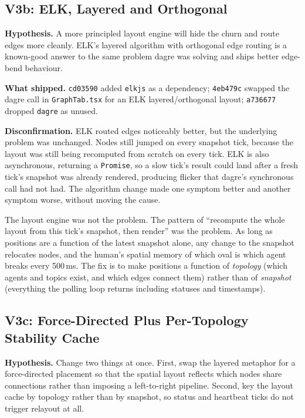 \documentclass[11pt,a4paper]{article}
\begin{document}
\subsection{V3b: ELK, Layered and Orthogonal}

\textbf{Hypothesis.} A more principled layout engine will hide
the churn and route edges more cleanly. ELK's layered algorithm
with orthogonal edge routing is a known-good answer to the same
problem dagre was solving and ships better edge-bend behaviour.

\textbf{What shipped.} \texttt{cd03590} added \texttt{elkjs} as a
dependency; \texttt{4eb479c} swapped the dagre call in
\texttt{GraphTab.tsx} for an ELK layered/orthogonal layout;
\texttt{a736677} dropped \texttt{dagre} as unused.

\textbf{Disconfirmation.} ELK routed edges noticeably better,
but the underlying problem was unchanged. Nodes still jumped on
every snapshot tick, because the layout was still being recomputed
from scratch on every tick. ELK is also asynchronous, returning a
\texttt{Promise}, so a slow tick's result could land after a
fresh tick's snapshot was already rendered, producing flicker
that dagre's synchronous call had not had. The algorithm change
made one symptom better and another symptom worse, without
moving the cause.

\begin{findingbox}
The layout engine was not the problem. The pattern of
``recompute the whole layout from this tick's snapshot, then
render'' was the problem. As long as positions are a function of
the latest snapshot alone, any change to the snapshot relocates
nodes, and the human's spatial memory of which oval is which
agent breaks every 500\,ms. The fix is to make positions a
function of \emph{topology} (which agents and topics exist, and
which edges connect them) rather than of \emph{snapshot}
(everything the polling loop returns including statuses and
timestamps).
\end{findingbox}

\subsection{V3c: Force-Directed Plus Per-Topology Stability Cache}

\textbf{Hypothesis.} Change two things at once. First, swap the
layered metaphor for a force-directed placement so that the
spatial layout reflects which nodes share connections rather than
imposing a left-to-right pipeline. Second, key the layout cache
by topology rather than by snapshot, so status and heartbeat
ticks do not trigger relayout at all.
\end{document}

